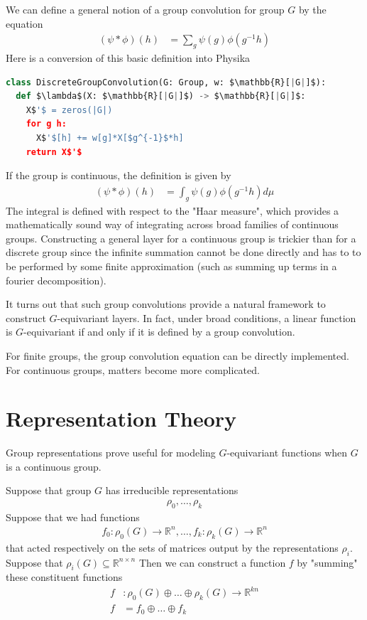 \documentclass[book.tex]{subfiles}
\begin{document}
We can define a general notion of a group convolution for group $G$ by the equation
\begin{align}
(\psi \ast \phi)(h) &= \sum_g \psi(g) \phi(g^{-1} h)
\end{align}
Here is a conversion of this basic definition into Physika
\begin{lstlisting}[language=python]
class DiscreteGroupConvolution(G: Group, w: $\mathbb{R}[|G|]$):
  def $\lambda$(X: $\mathbb{R}[|G|]$) -> $\mathbb{R}[|G|]$:
    X$'$ = zeros(|G|)
    for g h:
      X$'$[h] += w[g]*X[$g^{-1}$*h]
    return X$'$
\end{lstlisting}
If the group is continuous, the definition is given by
\begin{align}
(\psi \ast \phi)(h) &= \int_g \psi(g) \phi(g^{-1} h) d\mu
\end{align}
The integral is defined with respect to the "Haar measure", which provides a mathematically sound way of integrating across broad families of continuous groups. Constructing a general layer for a continuous group is trickier than for a discrete group since the infinite summation cannot be done directly and has to to be performed by some finite approximation (such as summing up terms in a fourier decomposition).

It turns out that such group convolutions provide a natural framework to construct $G$-equivariant layers. In fact, under broad conditions, a linear function is $G$-equivariant if and only if it is defined by a group convolution.

For finite groups, the group convolution equation can be directly implemented. For continuous groups, matters become more complicated.

\section{Representation Theory}

Group representations prove useful for modeling $G$-equivariant functions when $G$ is a continuous group.

Suppose that group $G$ has irreducible representations
\begin{align}
\rho_0,\dotsc, \rho_k
\end{align}
Suppose that we had functions
\begin{align}
f_0: \rho_0(G) \to \mathbb{R}^n,\dotsc, f_k: \rho_k(G) \to \mathbb{R}^n
\end{align}
that acted respectively on the sets of matrices output by the representations $\rho_i$. Suppose that $\rho_i(G) \subseteq \mathbb{R}^{n \times n}$ Then we can construct a function $f$ by "summing" these constituent functions
\begin{align}
f &: \rho_0(G) \oplus \dotsc \oplus \rho_k(G) \to \mathbb{R}^{kn} \\
f &= f_0 \oplus \dotsc \oplus f_k
\end{align}
\end{document}
